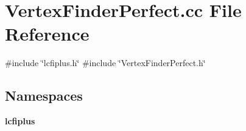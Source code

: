 \section{Vertex\+Finder\+Perfect.\+cc File Reference}
\label{VertexFinderPerfect_8cc}
{\ttfamily \#include \char`\"{}lcfiplus.\+h\char`\"{}}\newline
{\ttfamily \#include \char`\"{}Vertex\+Finder\+Perfect.\+h\char`\"{}}\newline
\subsection*{Namespaces}
\begin{DoxyCompactItemize}
\item 
 \textbf{ lcfiplus}
\end{DoxyCompactItemize}
